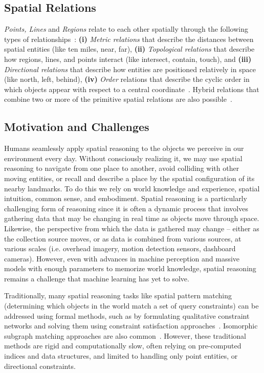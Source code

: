 \subsection{Spatial Relations}
\textit{Points, Lines} and \textit{Regions} relate to each other spatially through the following types of relationships~\cite{Carniel2020,Bertella2022,Carniel2023}: 
\textbf{(i)} \textit{Metric relations} that describe the distances between spatial entities (like ten miles, near, far), 
\textbf{(ii)} \textit{Topological relations} that describe how regions, lines, and points interact (like intersect, contain, touch), and 
\textbf{(iii)} \textit{Directional relations} that describe how entities are positioned relatively in space (like north, left, behind),
\textbf{(iv)} \textit{Order} relations that describe the cyclic order in which objects appear with respect to a central coordinate~\cite{Schwering2014}.
%
Hybrid relations that combine two or more of the primitive spatial relations are also possible~\cite{Carniel2023}.



\subsection{Motivation and Challenges}
Humans seamlessly apply spatial reasoning to the objects we perceive in our environment every day.
Without consciously realizing it, we may use spatial reasoning to navigate from one place to another, avoid colliding with other moving entities, or recall and describe a place by the spatial configuration of its nearby landmarks.
To do this we rely on world knowledge and experience, spatial intuition, common sense, and embodiment.
Spatial reasoning is a particularly challenging form of reasoning since it is often a dynamic process that involves gathering data that may be changing in real time as objects move through space.
Likewise, the perspective from which the data is gathered may change -- either as the collection source moves, or as data is combined from various sources, at various scales (i.e. overhead imagery, motion detection sensors, dashboard cameras).
However, even with advances in machine perception and massive models with enough parameters to memorize world knowledge, spatial reasoning remains a challenge that machine learning has yet to solve.

Traditionally, many spatial reasoning tasks like spatial pattern matching (determining which objects in the world match a set of query constraints) can be addressed using formal methods, such as by formulating qualitative constraint networks and solving them using constraint satisfaction approaches~\cite{Papadias1998, Schwering2014, Duckham2023}.
Isomorphic subgraph matching approaches are also common~\cite{Folkers2000, Chen2019, Fang2019}.
However, these traditional methods are rigid and computationally slow, often relying on pre-computed indices and data structures, and limited to handling only point entities, or directional constraints.



